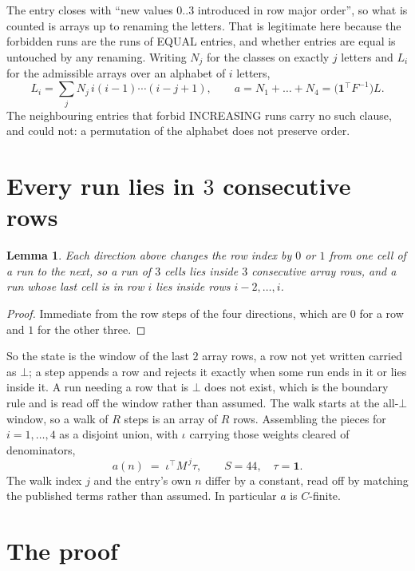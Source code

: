 \documentclass[11pt,a4paper]{article}
\theoremstyle{plain}
\newtheorem{lemma}[theorem]{Lemma}
\theoremstyle{definition}
\begin{document}
The entry closes with ``new values $0..3$ introduced in row major order'', so what is counted
is arrays up to renaming the letters. That is legitimate here because the forbidden runs are
the runs of EQUAL entries, and whether entries are equal is untouched by any renaming. Writing
$N_j$ for the classes on exactly $j$ letters and $L_i$ for the admissible arrays over an
alphabet of $i$ letters,
\[
L_i=\sum_j N_j\,i(i-1)\cdots(i-j+1),\qquad
a=N_1+\dots+N_{4}=\bigl(\mathbf{1}^{\!\top}F^{-1}\bigr)L .
\]
The neighbouring entries that forbid INCREASING runs carry no such clause, and could not: a
permutation of the alphabet does not preserve order.

\section{Every run lies in $3$ consecutive rows}

\begin{lemma}\label{lem:win}
Each direction above changes the row index by $0$ or $1$ from one cell of a run to the next, so
a run of $3$ cells lies inside $3$ consecutive array rows, and a run whose last cell is in
row $i$ lies inside rows $i-2,\dots,i$.
\end{lemma}

\begin{proof}
Immediate from the row steps of the four directions, which are $0$ for a row and $1$ for the
other three.
\end{proof}

So the state is the window of the last $2$ array rows, a row not yet written carried as
$\bot$; a step appends a row and rejects it exactly when some run ends in it or lies inside it.
A run needing a row that is $\bot$ does not exist, which is the boundary rule and is read off
the window rather than assumed. The walk starts at the all-$\bot$ window, so a walk of $R$ steps
is an array of $R$ rows. Assembling the pieces for $i=1,\dots,4$ as a disjoint union, with $\iota$ carrying those weights cleared of denominators,
\[
a(n)\;=\;\iota^{\!\top}M^{\,j}\tau ,\qquad S=44,\quad\tau=\mathbf{1} .
\]
The walk index $j$ and the entry's own $n$ differ by a constant, read off by matching the
published terms rather than assumed. In particular $a$ is $C$-finite.

\section{The proof}
\end{document}
